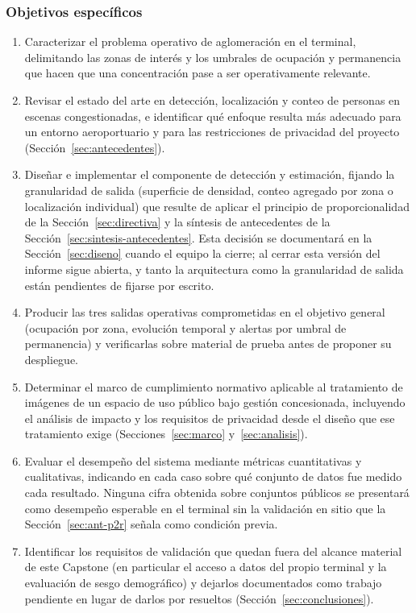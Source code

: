 \subsubsection*{Objetivos específicos}

\begin{enumerate}[leftmargin=1.6em,itemsep=0.35em]
  \item Caracterizar el problema operativo de aglomeración en el
        terminal, delimitando las zonas de interés y los umbrales de
        ocupación y permanencia que hacen que una concentración pase a
        ser operativamente relevante.
  \item Revisar el estado del arte en detección, localización y conteo
        de personas en escenas congestionadas, e identificar qué enfoque
        resulta más adecuado para un entorno aeroportuario y para las
        restricciones de privacidad del proyecto
        (Sección~\ref{sec:antecedentes}).
  \item Diseñar e implementar el componente de detección y estimación,
        fijando la granularidad de salida (superficie de densidad,
        conteo agregado por zona o localización individual) que
        resulte de aplicar el principio de proporcionalidad de la
        Sección~\ref{sec:directiva} y la síntesis de antecedentes de la
        Sección~\ref{sec:sintesis-antecedentes}. Esta decisión se documentará en la
        Sección~\ref{sec:diseno} cuando el equipo la cierre; al cerrar esta versión del informe sigue abierta, y tanto la arquitectura como la granularidad de salida están pendientes de fijarse por escrito.
  \item Producir las tres salidas operativas comprometidas en el
        objetivo general (ocupación por zona, evolución temporal y
        alertas por umbral de permanencia) y verificarlas sobre
        material de prueba antes de proponer su despliegue.
  \item Determinar el marco de cumplimiento normativo aplicable al
        tratamiento de imágenes de un espacio de uso público bajo
        gestión concesionada, incluyendo el análisis de impacto y los
        requisitos de privacidad desde el diseño que ese tratamiento
        exige (Secciones~\ref{sec:marco} y~\ref{sec:analisis}).
  \item Evaluar el desempeño del sistema mediante métricas cuantitativas
        y cualitativas, indicando en cada caso sobre qué conjunto de
        datos fue medido cada resultado. Ninguna cifra obtenida sobre
        conjuntos públicos se presentará como desempeño esperable en el
        terminal sin la validación en sitio que la
        Sección~\ref{sec:ant-p2r} señala como condición previa.
  \item Identificar los requisitos de validación que quedan fuera del
        alcance material de este Capstone (en particular el acceso a
        datos del propio terminal y la evaluación de sesgo demográfico)
        y dejarlos documentados como trabajo pendiente en lugar de
        darlos por resueltos (Sección~\ref{sec:conclusiones}).
\end{enumerate}

